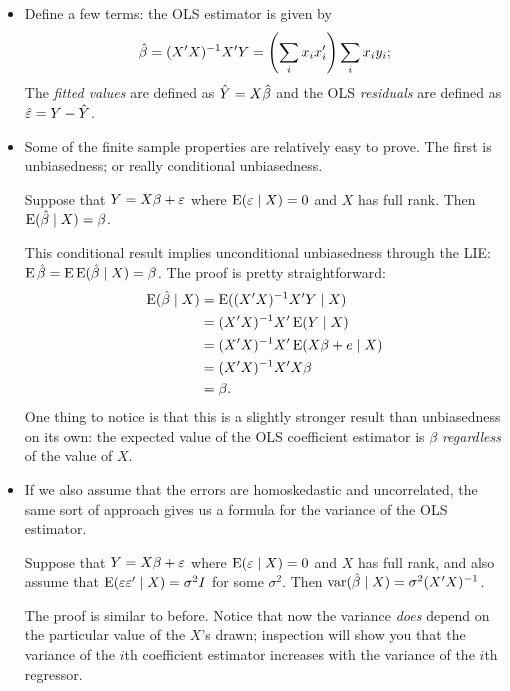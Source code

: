 \begin{itemize}[leftmargin=0pt]
\item Define a few terms: the OLS estimator is given by
  \begin{equation*}
    \hat{\beta} = (X'X)^{-1}X'Y = \left(\sum_i x_i x_i'\right) \sum_i x_i y_i;
  \end{equation*}
  The \emph{fitted values} are defined as $\hat{Y} = X \hat{\beta}$ and the OLS
  \emph{residuals} are defined as $\hat{\varepsilon} = Y - \hat{Y}$.

\item Some of the finite sample properties are relatively easy to
  prove.  The first is unbiasedness; or really conditional
  unbiasedness.
  \begin{thm}
    Suppose that $Y = X\beta + \varepsilon$ where $\operatorname{E}(\varepsilon \mid X) = 0$ and $X$ has
    full rank.  Then $\operatorname{E}(\hat{\beta} \mid X) = \beta$.
  \end{thm}
  This conditional result implies unconditional unbiasedness through
  the LIE: $\operatorname{E} \hat{\beta} = \operatorname{E} \operatorname{E}(\hat{\beta} \mid X) = \beta$.  The proof is pretty
  straightforward:
  \begin{align*}
    \operatorname{E}(\hat{\beta} \mid X) &= \operatorname{E}((X'X)^{-1} X'Y \mid X) \\
    &= (X'X)^{-1} X'\operatorname{E}(Y \mid X) \\
    &= (X'X)^{-1} X'\operatorname{E}(X\beta + e \mid X) \\
    &= (X'X)^{-1} X'X \beta \\
    &= \beta.
  \end{align*}
  One thing to notice is that this is a slightly stronger result than
  unbiasedness on its own: the expected value of the OLS coefficient
  estimator is $\beta$ \emph{regardless} of the value of $X$.

\item If we also assume that the errors are homoskedastic and
  uncorrelated, the same sort of approach gives us a formula for the
  variance of the OLS estimator.
  \begin{thm}
    Suppose that $Y = X\beta + \varepsilon$ where $\operatorname{E}(\varepsilon \mid X) = 0$ and $X$ has
    full rank, and also assume that $\operatorname{E}(\varepsilon \varepsilon' \mid X) = \sigma^2 I$ for some
    $\sigma^2$.  Then $\operatorname{var}(\hat{\beta} \mid X) = \sigma^2(X'X)^{-1}$.
  \end{thm}

  The proof is similar to before.  Notice that now the variance
  \emph{does} depend on the particular value of the $X$'s drawn;
  inspection will show you that the variance of the $i$th coefficient
  estimator increases with the variance of the $i$th regressor.


\end{itemize}
